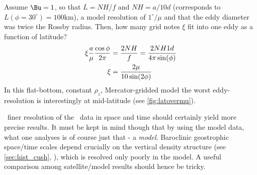 \begin{infobox}
\label{box:horRes}
Assume $\Bu=1$, so that $L=NH/f$ and $NH=a/10d$ (corresponds to $L(\phi=30^{\circ})=100$km), a model resolution of $1^{\circ}/\mu$ and that the eddy diameter was twice the Rossby radius. Then, how many grid notes $\xi$ fit into one eddy as a function of latitude?
\begin{align}
	\xi \frac{a}{\mu} \frac{\cos \phi}{2 \pi}
	&=
	\frac{2NH }{f} = \frac{2NH 1d}{4 \pi  \sin(\phi)}\notag\\
	\xi
	&=
	 \frac{ 2\mu }{10  \sin(2\phi)}\notag\\
\end{align}
In this flat-bottom, constant $\rho_z$, Mercator-gridded model the worst eddy-resolution is interestingly at mid-latitude (see \cref{fig:latovermu}).
\end{infobox}

~finer resolution of the \POP~data in space and time should certainly yield more precise results.
It must be kept in mind though that by using the model data, what one analyses is of course just that - a \emph{model}. Baroclinic geostrophic space/time scales depend crucially on \eg the vertical density structure (see \cref{sec:hist_cush}, \citet{Rhines1979}), which is resolved only poorly in the model. A useful comparison among satellite/model results should hence be tricky.   
